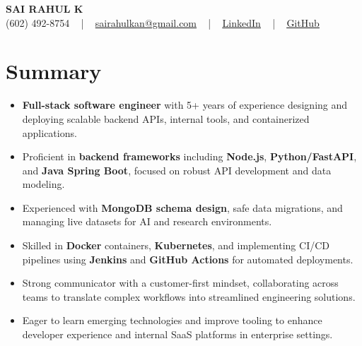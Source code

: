\documentclass[letterpaper,11pt]{article}
\newcommand{\resumeItem}[1]{
  \item\footnotesize{
    {#1 \vspace{-2pt}}
  }
}
\newcommand{\resumeItemListStart}{\begin{itemize}[leftmargin=*]}
\newcommand{\resumeItemListEnd}{\end{itemize}\vspace{-5pt}}
\begin{document}
\begin{center}
    {\fontsize{14pt}{12pt}\selectfont \textbf{\MakeUppercase{Sai Rahul K}}}\\ \vspace{2pt}
    \fontsize{10pt}{12pt}\selectfont (602) 492-8754 ~ | ~ \href{mailto:sairahulkan@gmail.com}{sairahulkan@gmail.com} ~ | ~
    \href{https://www.linkedin.com/in/rq123/}{\color{blue}\underline{LinkedIn}} ~ | ~
    \href{https://github.com/kanrahuldo}{\color{blue}\underline{GitHub}}~
    \vspace{-8pt}
\end{center}

\section{Summary}
\fontsize{9pt}{10pt}\selectfont
\resumeItemListStart
    \resumeItem{\textbf{Full-stack software engineer} with 5+ years of experience designing and deploying scalable backend APIs, internal tools, and containerized applications.}
    \resumeItem{Proficient in \textbf{backend frameworks} including \textbf{Node.js}, \textbf{Python/FastAPI}, and \textbf{Java Spring Boot}, focused on robust API development and data modeling.}
    \resumeItem{Experienced with \textbf{MongoDB schema design}, safe data migrations, and managing live datasets for AI and research environments.}
    \resumeItem{Skilled in \textbf{Docker} containers, \textbf{Kubernetes}, and implementing CI/CD pipelines using \textbf{Jenkins} and \textbf{GitHub Actions} for automated deployments.}
    \resumeItem{Strong communicator with a customer-first mindset, collaborating across teams to translate complex workflows into streamlined engineering solutions.}
    \resumeItem{Eager to learn emerging technologies and improve tooling to enhance developer experience and internal SaaS platforms in enterprise settings.}
\resumeItemListEnd
\vspace{-6pt}
\end{document}
